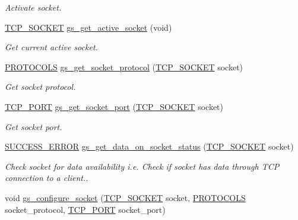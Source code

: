 \begin{DoxyCompactItemize}
\begin{DoxyCompactList}\small\item\em Activate socket. \end{DoxyCompactList}\item 
\hyperlink{group__wireless__interface_gab2d7ad3f99c2b04b0f5f5a77eefc5355}{T\+C\+P\+\_\+\+S\+O\+C\+K\+ET} \hyperlink{group__wireless__interface_gadd2796299c188849e984ee47eb651af0}{gs\+\_\+get\+\_\+active\+\_\+socket} (void)
\begin{DoxyCompactList}\small\item\em Get current active socket. \end{DoxyCompactList}\item 
\hyperlink{group__wireless__interface_ga2966051bfea778d846d94013f7cb888d}{P\+R\+O\+T\+O\+C\+O\+LS} \hyperlink{group__wireless__interface_ga79400124912ba504565f5fa3a1a86f98}{gs\+\_\+get\+\_\+socket\+\_\+protocol} (\hyperlink{group__wireless__interface_gab2d7ad3f99c2b04b0f5f5a77eefc5355}{T\+C\+P\+\_\+\+S\+O\+C\+K\+ET} socket)
\begin{DoxyCompactList}\small\item\em Get socket protocol. \end{DoxyCompactList}\item 
\hyperlink{group__wireless__interface_ga6be486e56223df1b41c1f3a04cb7d471}{T\+C\+P\+\_\+\+P\+O\+RT} \hyperlink{group__wireless__interface_ga5f0003ed79a9930162bff98358394517}{gs\+\_\+get\+\_\+socket\+\_\+port} (\hyperlink{group__wireless__interface_gab2d7ad3f99c2b04b0f5f5a77eefc5355}{T\+C\+P\+\_\+\+S\+O\+C\+K\+ET} socket)
\begin{DoxyCompactList}\small\item\em Get socket port. \end{DoxyCompactList}\item 
\hyperlink{group__wireless__interface_ga2e53871073b531f122f463441c113633}{S\+U\+C\+C\+E\+S\+S\+\_\+\+E\+R\+R\+OR} \hyperlink{group__wireless__interface_gac5f323b546815b3b0a9ac0fcdc59a3ca}{gs\+\_\+get\+\_\+data\+\_\+on\+\_\+socket\+\_\+status} (\hyperlink{group__wireless__interface_gab2d7ad3f99c2b04b0f5f5a77eefc5355}{T\+C\+P\+\_\+\+S\+O\+C\+K\+ET} socket)
\begin{DoxyCompactList}\small\item\em Check socket for data availability i.\+e. Check if socket has data through T\+CP connection to a client.. \end{DoxyCompactList}\item 
void \hyperlink{group__wireless__interface_ga0bd5c458ea6b7b093774e1a4ac19f134}{gs\+\_\+configure\+\_\+socket} (\hyperlink{group__wireless__interface_gab2d7ad3f99c2b04b0f5f5a77eefc5355}{T\+C\+P\+\_\+\+S\+O\+C\+K\+ET} socket, \hyperlink{group__wireless__interface_ga2966051bfea778d846d94013f7cb888d}{P\+R\+O\+T\+O\+C\+O\+LS} socket\+\_\+protocol, \hyperlink{group__wireless__interface_ga6be486e56223df1b41c1f3a04cb7d471}{T\+C\+P\+\_\+\+P\+O\+RT} socket\+\_\+port)

\end{DoxyCompactItemize}

